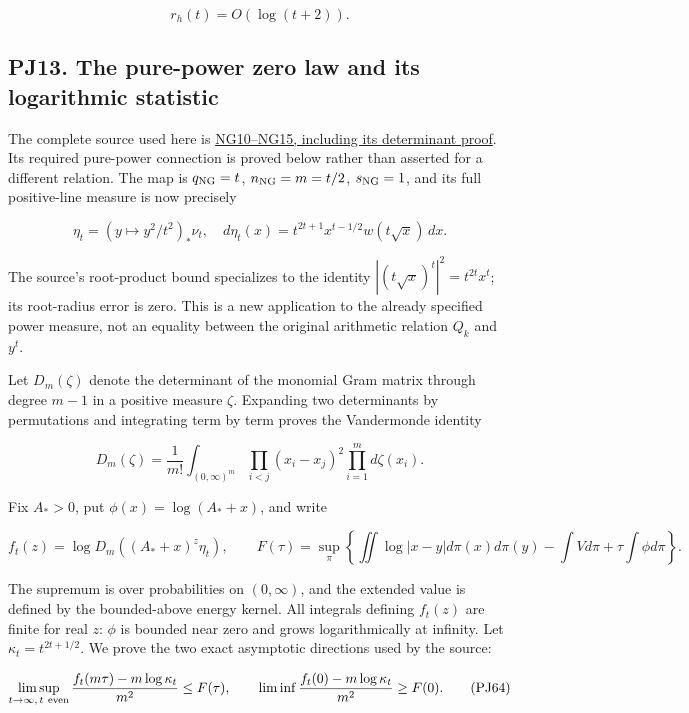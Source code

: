 \documentclass[10pt]{article}
\begin{document}
\[
r_h(t)=O(\log(t+2)).
\tag{PJ60}
\]

\subsection{PJ13. The pure-power zero law and its logarithmic statistic}\label{pj13.-the-pure-power-zero-law-and-its-logarithmic-statistic}

The complete source used here is \href{https://github.com/KokunoYumeto/zeta-function-research-reader/blob/5992ad50c0f2a06921f1fcaded7b4e38097c0739/workbenches/splitzero-tandem/continuations/20260920-original-kernel-mixed-determinants/providers/NATIVE_GAUSSIAN_TRANSFER.tex\#L203}{NG10--NG15, including its determinant proof}. Its required pure-power connection is proved below rather than asserted for a different relation. The map is \(q_{\rm NG}=t\), \(n_{\rm NG}=m=t/2\), \(s_{\rm NG}=1\), and its full positive-line measure is now precisely

\[
\eta_t=(y\mapsto y^2/t^2)_*\nu_t,
\quad
d\eta_t(x)=t^{2t+1}x^{t-1/2}w(t\sqrt{x})\,dx.
\tag{PJ61}
\]

The source's root-product bound specializes to the identity \(|(t\sqrt{x})^t|^2=t^{2t}x^t\); its root-radius error is zero. This is a new application to the already specified power measure, not an equality between the original arithmetic relation \(Q_k\) and \(y^t\).

Let \(D_m(\zeta)\) denote the determinant of the monomial Gram matrix through degree \(m-1\) in a positive measure \(\zeta\). Expanding two determinants by permutations and integrating term by term proves the Vandermonde identity

\[
D_m(\zeta)=\frac1{m!}\int_{(0,\infty)^m}
\prod_{i<j}(x_i-x_j)^2\prod_{i=1}^md\zeta(x_i).
\tag{PJ62}
\]

Fix \(A_*>0\), put \(\phi(x)=\log(A_*+x)\), and write

\[
f_t(z)=\log D_m((A_*+x)^z\eta_t),\qquad
F(\tau)=\sup_{\pi}\left\{\iint\log|x-y|d\pi(x)d\pi(y)
-\int Vd\pi+\tau\int\phi d\pi\right\}.
\tag{PJ63}
\]

The supremum is over probabilities on \((0,\infty)\), and the extended value is defined by the bounded-above energy kernel. All integrals defining \(f_t(z)\) are finite for real \(z\): \(\phi\) is bounded near zero and grows logarithmically at infinity. Let \(\kappa_t=t^{2t+1/2}\). We prove the two exact asymptotic directions used by the source:

\[
\limsup_{t\to\infty,\,t\ {\rm even}}
\frac{f_t(m\tau)-m\log\kappa_t}{m^2}\le F(\tau),
\qquad
\liminf\frac{f_t(0)-m\log\kappa_t}{m^2}\ge F(0).
\tag{PJ64}
\]
\end{document}
